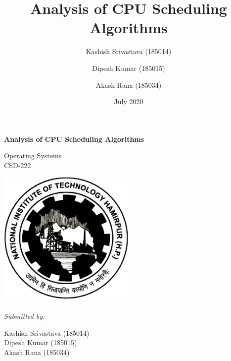 \documentclass[11pt,a4paper]{report}
\begin{document}
\title{Analysis of CPU Scheduling Algorithms}

\author{Kashish Srivastava (185014)\\
        \and 
        Dipesh Kumar (185015)\\
        \and
        Akash Rana (185034)
}

\date{July 2020}

\pagestyle{plain}

\begin{titlepage}
    \begin{center}

        \Huge{\textbf{Analysis of CPU Scheduling Algorithms}}
 
        \vspace{0.5cm}
        
        \normalsize
       
        \vspace{10pt}
        
        Operating Systems\\
        CSD-222

    
        \vspace{1cm}
        \includegraphics[width=0.5\textwidth]{logo.png}
        
        \vspace{2cm}
        \textit{Submitted by:}

            Kashish Srivastava (185014)\\
            Dipesh Kumar (185015)\\
            Akash Rana (185034)
        \vspace{5pt}
        
        \begin{tabular}{c c}
            
        \end{tabular}
 

\end{center}
\end{titlepage}
\end{document}
